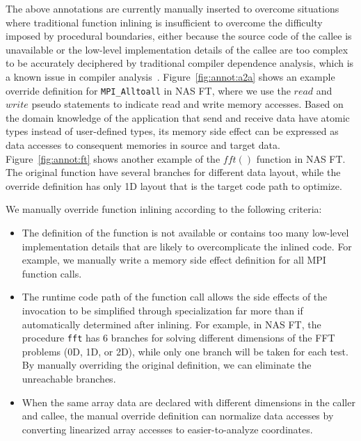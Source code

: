 The above annotations are currently manually inserted to overcome situations where
traditional function inlining is insufficient to overcome the difficulty
imposed by procedural boundaries, either because the source code of the callee is unavailable 
or the low-level
implementation details of the callee are too complex to be accurately
deciphered by traditional compiler dependence analysis, which is a known issue in compiler analysis~\cite{POET:ICPP11}. 
Figure~\ref{fig:annot:a2a}
shows an example override definition for \texttt{MPI\_Alltoall} in NAS
FT, where we use the $read$ and $write$ pseudo statements to indicate
read and write memory accesses.  Based on the domain knowledge of the
application that send and receive data have atomic types instead of
user-defined types, its memory side effect can be expressed as data
accesses to consequent memories in source and target data.
Figure~\ref{fig:annot:ft} shows another example of the $fft()$
function in NAS FT.  The original function have several branches for
different data layout, while the override definition has only 1D
layout that is the target code path to optimize.

We manually override function inlining according to the following
criteria:

\begin{itemize}

\item The definition of the function is not available or contains too
  many low-level implementation details that are likely to
  overcomplicate the inlined code.  For example, we manually write a
  memory side effect definition for all MPI function calls.

\item The runtime code path of the function call allows the side
  effects of the invocation to be simplified through specialization
  far more than if automatically determined after inlining.  For
  example, in NAS FT, the procedure \texttt{fft} has 6 branches for
  solving different dimensions of the FFT problems (0D, 1D, or 2D),
  while only one branch will be taken for each test.  By manually
  overriding the original definition, we can eliminate the unreachable
  branches.

\item When the same array data are declared with different dimensions
  in the caller and callee, the manual override definition can
  normalize data accesses by converting linearized array accesses to
  easier-to-analyze coordinates.

\end{itemize}


